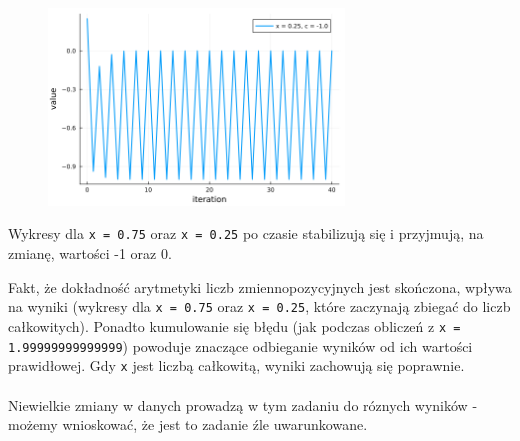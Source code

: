\documentclass[15pt, a4paper]{article}
\begin{document}
\begin{figure}[h]
    \centering
    \includegraphics[width=0.7\textwidth]{img/6_7_plot.png}
\end{figure}

\vspace{0.5cm}

\noindent Wykresy dla \verb|x = 0.75| oraz \verb|x = 0.25| po czasie stabilizują się i przyjmują, na zmianę, wartości -1 oraz 0.

\vspace{0.5cm}

\noindent Fakt, że dokładność arytmetyki liczb zmiennopozycyjnych jest skończona, wpływa na wyniki (wykresy dla \verb|x = 0.75| oraz \verb|x = 0.25|, które zaczynają zbiegać do liczb całkowitych).  Ponadto kumulowanie się błędu (jak podczas obliczeń z \verb|x = 1.99999999999999|) powoduje znaczące odbieganie wyników od ich wartości prawidłowej. Gdy \verb|x| jest liczbą całkowitą, wyniki zachowują się poprawnie.\\\\
Niewielkie zmiany w danych prowadzą w tym zadaniu do róznych wyników - możemy wnioskować, że jest to zadanie źle uwarunkowane.
\end{document}
